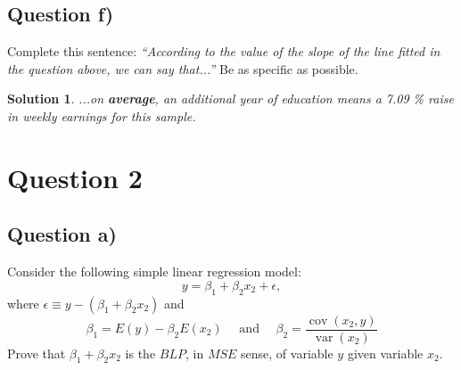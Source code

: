 \documentclass[9pt]{tufte-handout}
\newcommand{\problem}[1]{{\color{gray} #1}}
\newcommand{\solution}[1]{{\color{NavyBlue} #1}}
\newcommand{\qedblack}{\hfill \blacksquare}
\newtheorem*{Solution}{Solution}
\begin{document}
\subsection{Question f)}
\problem{Complete this sentence: \textit{``According to the value of the slope of the line fitted in the question above, we can say that...''} Be as specific as possible.
}
\solution{\begin{Solution}
	\normalfont
	...on \textbf{average}, an additional year of education means a 7.09 \% raise in weekly earnings for this sample.
	\qedblack
	\end{Solution}
}

\section{Question 2}
\subsection{Question a)}
\problem{Consider the following simple linear regression model:
$$
y=\beta_1+\beta_2 x_2+\epsilon,
$$
where $\epsilon \equiv y-(\beta_1+\beta_2 x_2)$ and
$$
\beta_1=E(y)-\beta_2 E\left(x_2\right) \quad \text { and } \quad \beta_2=\frac{\operatorname{cov}\left(x_2, y\right)}{\operatorname{var}\left(x_2\right)}
$$
Prove that $\beta_1+\beta_2 x_2$ is the $B L P$, in $M S E$ sense, of variable $y$ given variable $x_2$.
}
\end{document}
